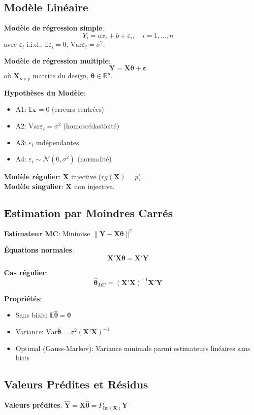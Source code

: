 \documentclass[8pt,twocolumn]{article}
\newcommand{\mydef}[1]{\textcolor{defcolor}{\textbf{#1}}}
\newcommand{\myprop}[1]{\textcolor{propcolor}{\textbf{#1}}}
\newcommand{\R}{\mathbb{R}}
\newcommand{\E}{\mathbb{E}}
\newcommand{\Var}{\text{Var}}
\begin{document}
\subsection{Modèle Linéaire}
\mydef{Modèle de régression simple}:
$$Y_i = ax_i + b + \varepsilon_i,\quad i=1,\ldots,n$$
avec $\varepsilon_i$ i.i.d., $\E\varepsilon_i=0$, $\Var\varepsilon_i=\sigma^2$.

\mydef{Modèle de régression multiple}:
$$\mathbf{Y} = \mathbf{X}\boldsymbol{\theta} + \boldsymbol{\varepsilon}$$
où $\mathbf{X}_{n\times p}$ matrice du design, $\boldsymbol{\theta}\in\R^p$.

\mydef{Hypothèses du Modèle}:
\begin{itemize}[nosep]
\item A1: $\E\boldsymbol{\varepsilon} = 0$ (erreurs centrées)
\item A2: $\Var\varepsilon_i = \sigma^2$ (homoscédasticité)
\item A3: $\varepsilon_i$ indépendantes
\item A4: $\varepsilon_i \sim \mathcal{N}(0,\sigma^2)$ (normalité)
\end{itemize}

\mydef{Modèle régulier}: $\mathbf{X}$ injective ($rg(\mathbf{X})=p$).\\
\mydef{Modèle singulier}: $\mathbf{X}$ non injective.

\subsection{Estimation par Moindres Carrés}
\mydef{Estimateur MC}: Minimise $\|\mathbf{Y} - \mathbf{X}\boldsymbol{\theta}\|^2$

\myprop{Équations normales}:
$$\mathbf{X}'\mathbf{X}\boldsymbol{\theta} = \mathbf{X}'\mathbf{Y}$$

\myprop{Cas régulier}:
$$\hat{\boldsymbol{\theta}}_{MC} = (\mathbf{X}'\mathbf{X})^{-1}\mathbf{X}'\mathbf{Y}$$

\myprop{Propriétés}:
\begin{itemize}[nosep]
\item Sans biais: $\E\hat{\boldsymbol{\theta}} = \boldsymbol{\theta}$
\item Variance: $\Var\hat{\boldsymbol{\theta}} = \sigma^2(\mathbf{X}'\mathbf{X})^{-1}$
\item Optimal (Gauss-Markov): Variance minimale parmi estimateurs linéaires sans biais
\end{itemize}

\subsection{Valeurs Prédites et Résidus}
\mydef{Valeurs prédites}: $\hat{\mathbf{Y}} = \mathbf{X}\hat{\boldsymbol{\theta}} = P_{\text{Im}(\mathbf{X})}\mathbf{Y}$
\end{document}

